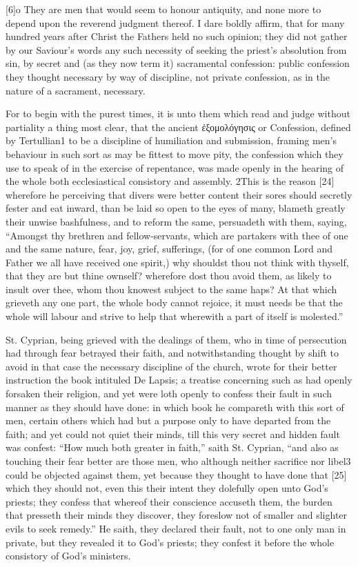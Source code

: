 [6]o They are men that would seem to honour antiquity, and none more to depend upon the reverend judgment thereof. I dare boldly affirm, that for many hundred years after Christ the Fathers held no such opinion; they did not gather by our Saviour’s words any such necessity of seeking the priest’s absolution from sin, by secret and (as they now term it) sacramental confession: public confession they thought necessary by way of discipline, not private confession, as in the nature of a sacrament, necessary.

For to begin with the purest times, it is unto them which read and judge without partiality a thing most clear, that the ancient ἐξομολόγησις or Confession, defined by Tertullian1 to be a discipline of humiliation and submission, framing men’s behaviour in such sort as may be fittest to move pity, the confession which they use to speak of in the exercise of repentance, was made openly in the hearing of the whole both ecclesiastical consistory and assembly. 2This is the reason [24] wherefore he perceiving that divers were better content their sores should secretly fester and eat inward, than be laid so open to the eyes of many, blameth greatly their unwise bashfulness, and to reform the same, persuadeth with them, saying, “Amongst thy brethren and fellow-servants, which are partakers with thee of one and the same nature, fear, joy, grief, sufferings, (for of one common Lord and Father we all have received one spirit,) why shouldst thou not think with thyself, that they are but thine ownself? wherefore dost thou avoid them, as likely to insult over thee, whom thou knowest subject to the same haps? At that which grieveth any one part, the whole body cannot rejoice, it must needs be that the whole will labour and strive to help that wherewith a part of itself is molested.”

St. Cyprian, being grieved with the dealings of them, who in time of persecution had through fear betrayed their faith, and notwithstanding thought by shift to avoid in that case the necessary discipline of the church, wrote for their better instruction the book intituled De Lapsis; a treatise concerning such as had openly forsaken their religion, and yet were loth openly to confess their fault in such manner as they should have done: in which book he compareth with this sort of men, certain others which had but a purpose only to have departed from the faith; and yet could not quiet their minds, till this very secret and hidden fault was confest: “How much both greater in faith,” saith St. Cyprian, “and also as touching their fear better are those men, who although neither sacrifice nor libel3 could be objected against them, yet because they thought to have done that [25] which they should not, even this their intent they dolefully open unto God’s priests; they confess that whereof their conscience accuseth them, the burden that presseth their minds they discover, they foreslow not of smaller and slighter evils to seek remedy.” He saith, they declared their fault, not to one only man in private, but they revealed it to God’s priests; they confest it before the whole consistory of God’s ministers.

